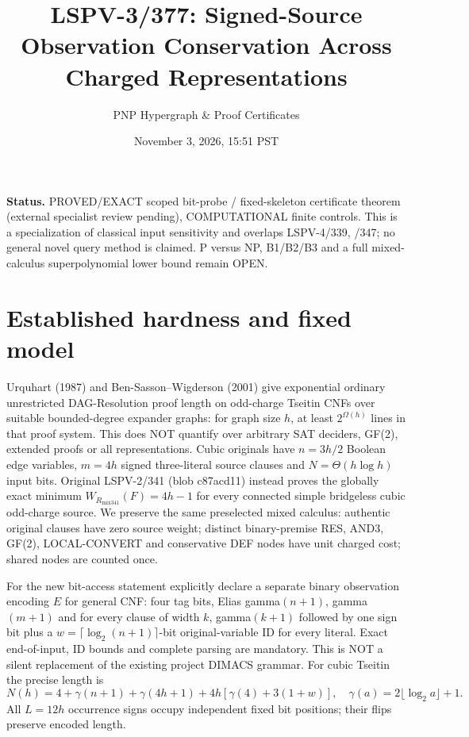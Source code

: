 \documentclass[11pt]{article}
\title{LSPV-3/377: Signed-Source Observation Conservation Across Charged Representations}
\author{PNP Hypergraph \& Proof Certificates}
\date{November 3, 2026, 15:51 PST}
\begin{document}
\maketitle
\noindent\textbf{Status.} PROVED/EXACT scoped bit-probe / fixed-skeleton certificate theorem (external specialist review pending), COMPUTATIONAL finite controls. This is a specialization of classical input sensitivity and overlaps LSPV-4/339, /347; no general novel query method is claimed. P versus NP, B1/B2/B3 and a full mixed-calculus superpolynomial lower bound remain OPEN.

\section*{Established hardness and fixed model}
Urquhart (1987) and Ben-Sasson--Wigderson (2001) give exponential ordinary unrestricted DAG-Resolution proof length on odd-charge Tseitin CNFs over suitable bounded-degree expander graphs: for graph size $h$, at least $2^{\Omega(h)}$ lines in that proof system. This does NOT quantify over arbitrary SAT deciders, GF(2), extended proofs or all representations. Cubic originals have $n=3h/2$ Boolean edge variables, $m=4h$ signed three-literal source clauses and $N=\Theta(h\log h)$ input bits. Original LSPV-2/341 (blob c87acd11) instead proves the globally exact minimum $W_{R_{\mathrm{mix341}}}(F)=4h-1$ for every connected simple bridgeless cubic odd-charge source. We preserve the same preselected mixed calculus: authentic original clauses have zero source weight; distinct binary-premise RES, AND3, GF(2), LOCAL-CONVERT and conservative DEF nodes have unit charged cost; shared nodes are counted once.

For the new bit-access statement explicitly declare a separate binary observation encoding $E$ for general CNF: four tag bits, Elias gamma$(n+1)$, gamma$(m+1)$ and for every clause of width $k$, gamma$(k+1)$ followed by one sign bit plus a $w=\lceil\log_2(n+1)\rceil$-bit original-variable ID for every literal. Exact end-of-input, ID bounds and complete parsing are mandatory. This is NOT a silent replacement of the existing project DIMACS grammar. For cubic Tseitin the precise length is
\[
N(h)=4+\gamma(n+1)+\gamma(4h+1)+4h[\gamma(4)+3(1+w)],\quad
\gamma(a)=2\lfloor\log_2a\rfloor+1 .
\]
All $L=12h$ occurrence signs occupy independent fixed bit positions; their flips preserve encoded length.
\end{document}

